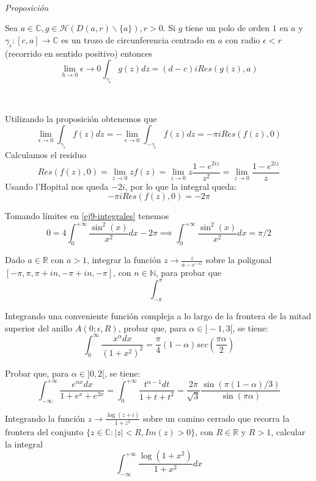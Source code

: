 \begin{sol}
\


	\textit{Proposición}

	Sea $a\in\mathbb{C}, g\in\mathcal{H}(D(a,r)\backslash\{a\}), r>0$. Si $g$ tiene un polo de orden $1$ en $a$ y $\gamma_{\epsilon} : [c,a] \rightarrow\mathbb{C}$ es un trozo de circunferencia centrado en $a$ con radio $\epsilon<r$ (recorrido en sentido positivo) entonces
	$$ \lim_{h\rightarrow 0}\epsilon\rightarrow 0 \int_{\gamma_{\epsilon}} g(z)dz = (d-c)iRes(g(z),a) $$

\

Utilizando la proposición obtenemos que
$$ \lim_{\epsilon\rightarrow 0} \int_{\gamma_{\epsilon}} f(z)dz = -\lim_{\epsilon\rightarrow 0} \int_{-\gamma_{\epsilon}} f(z)dz = -\pi iRes(f(z),0) $$
Calculamos el residuo
$$ Res(f(z),0) = \lim_{z\rightarrow 0} zf(z) = \lim_{z\rightarrow 0} z \frac{1-e^{2iz}}{z^2} =  \lim_{z\rightarrow 0} \frac{1-e^{2iz}}{z} $$
Usando l'Hopital nos queda $-2i$, por lo que la integral queda:
$$ -\pi iRes(f(z),0) = -2\pi $$

Tomando límites en \ref{ej9-integrales} tenemos
$$ 0=4\int_{0}^{+\infty} \frac{\sin^2(x)}{x^2} dx -2\pi  \implies  \int_{0}^{+\infty} \frac{\sin^2(x)}{x^2}dx = \pi/2 $$
\end{sol}


\begin{ejer}
	Dado $a\in\mathbb{R}$ con $a>1$, integrar la función $z\rightarrow \frac{z}{a-e^{-iz}}$ sobre la poligonal $[-\pi,\pi,\pi+in,-\pi+in,-\pi]$, con $n\in\mathbb{N}$, para probar que
	$$ \int_{-\pi}^{\pi} $$
\end{ejer}


\begin{ejer}
	Integrando una conveniente función compleja a lo largo de la frontera de la mitad superior del anillo $A(0;\epsilon,R)$, probar que, para $\alpha\in]-1,3[$, se tiene:
	$$ \int_{0}^{\infty} \frac{x^{\alpha}dx}{(1+x^2)^2} = \frac{\pi}{4}(1-\alpha)sec(\frac{\pi\alpha}{2}) $$
\end{ejer}


\begin{ejer}
	Probar que, para $\alpha\in ]0,2[$, se tiene:
	$$ \int_{-\infty}^{+\infty} \frac{e^{\alpha x}dx}{1+e^x+e^{2x}} = \int_{0}^{+\infty} \frac{t^{\alpha-1} dt}{1+t+t^2} = \frac{2\pi}{\sqrt{3}}\frac{\sin(\pi(1-\alpha)/3)}{\sin(\pi\alpha)} $$
\end{ejer}


\begin{ejer}
	Integrando la función $z\rightarrow\frac{\log(z+i)}{1+z^2}$ sobre un camino cerrado que recorra la frontera del conjunto $\{ z\in\mathbb{C} : |z|<R, Im(z)>0 \}$, con $R\in\mathbb{R}$ y $R>1$, calcular la integral
	$$ \int_{-\infty}^{+\infty} \frac{\log(1+x^2)}{1+x^2}dx $$
\end{ejer}




